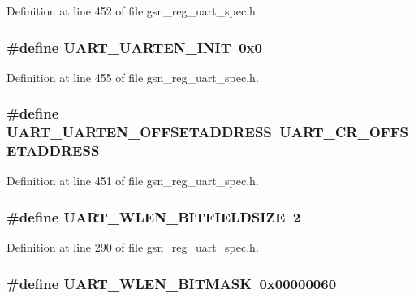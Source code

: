 Definition at line 452 of file gsn\_\-reg\_\-uart\_\-spec.h.

\hypertarget{a00575_afed1655d9c6ad3512c1284134d091d3e}{
\subsubsection[{UART\_\-UARTEN\_\-INIT}]{\setlength{\rightskip}{0pt plus 5cm}\#define UART\_\-UARTEN\_\-INIT~0x0}}
\label{a00575_afed1655d9c6ad3512c1284134d091d3e}


Definition at line 455 of file gsn\_\-reg\_\-uart\_\-spec.h.

\hypertarget{a00575_a9693494faefa3c03e6560d2403b0a44c}{
\subsubsection[{UART\_\-UARTEN\_\-OFFSETADDRESS}]{\setlength{\rightskip}{0pt plus 5cm}\#define UART\_\-UARTEN\_\-OFFSETADDRESS~UART\_\-CR\_\-OFFSETADDRESS}}
\label{a00575_a9693494faefa3c03e6560d2403b0a44c}


Definition at line 451 of file gsn\_\-reg\_\-uart\_\-spec.h.

\hypertarget{a00575_ac7c6de9a45f8c95d3a74cc4f9e14aaab}{
\subsubsection[{UART\_\-WLEN\_\-BITFIELDSIZE}]{\setlength{\rightskip}{0pt plus 5cm}\#define UART\_\-WLEN\_\-BITFIELDSIZE~2}}
\label{a00575_ac7c6de9a45f8c95d3a74cc4f9e14aaab}


Definition at line 290 of file gsn\_\-reg\_\-uart\_\-spec.h.

\hypertarget{a00575_ae73bcb260ab7a0a9c5acae575ffd652f}{
\subsubsection[{UART\_\-WLEN\_\-BITMASK}]{\setlength{\rightskip}{0pt plus 5cm}\#define UART\_\-WLEN\_\-BITMASK~0x00000060}}
\label{a00575_ae73bcb260ab7a0a9c5acae575ffd652f}



